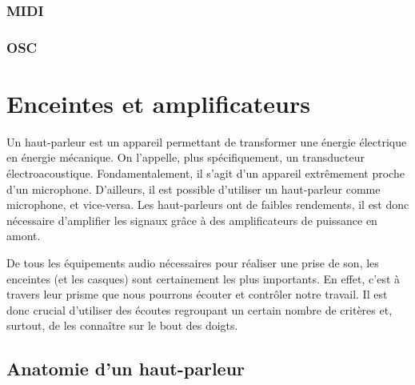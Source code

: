\documentclass[
]{book}
\begin{document}
\hypertarget{midi}{%
\subsection{MIDI}\label{midi}}

\hypertarget{osc}{%
\subsection{OSC}\label{osc}}

\hypertarget{enceintes-et-amplificateurs}{%
\chapter{Enceintes et amplificateurs}\label{enceintes-et-amplificateurs}}

Un haut-parleur est un appareil permettant de transformer une énergie électrique en énergie mécanique. On l'appelle, plus spécifiquement, un transducteur électroacoustique. Fondamentalement, il s'agit d'un appareil extrêmement proche d'un microphone. D'ailleurs, il est possible d'utiliser un haut-parleur comme microphone, et vice-versa. Les haut-parleurs ont de faibles rendements, il est donc nécessaire d'amplifier les signaux grâce à des amplificateurs de puissance en amont.

De tous les équipements audio nécessaires pour réaliser une prise de son, les enceintes (et les casques) sont certainement les plus importants. En effet, c'est à travers leur prisme que nous pourrons écouter et contrôler notre travail. Il est donc crucial d'utiliser des écoutes regroupant un certain nombre de critères et, surtout, de les connaître sur le bout des doigts.

\hypertarget{anatomie-dun-haut-parleur}{%
\section{Anatomie d'un haut-parleur}\label{anatomie-dun-haut-parleur}}
\end{document}
